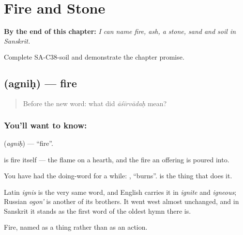 
\chapter{Fire and Stone}
\label{ch:sa-fire-and-stone}

\begin{chapteropening}
\textbf{By the end of this chapter:} \emph{I can name fire, ash, a stone, sand and soil in Sanskrit.}

Complete SA-C38-soil and demonstrate the chapter promise.
\end{chapteropening}

\section[\texorpdfstring{\sk{अग्निः} (agniḥ)}{अग्निः (agniḥ)}]{ (agniḥ) — fire}

\label{lesson:SA-C38-fire}



\begin{quote}
Before the new word: what did \emph{āśīrvādaḥ} mean?
\end{quote}

\subsection*{You'll want to know: }
\textbf{} (\emph{agniḥ}) — \textquotedblleft{}fire\textquotedblright{}.

\textbf{} is fire itself — the flame on a hearth, and the fire an offering is poured into.

You have had the doing-word for a while: , \textquotedblleft{}burns\textquotedblright{}. \textbf{} is the thing that does it.

Latin \emph{ignis} is the very same word, and English carries it in \emph{ignite} and \emph{igneous}; Russian \emph{ogon'} is another of its brothers. It went west almost unchanged, and in Sanskrit it stands as the first word of the oldest hymn there is.

\begin{grammarlens}[title={What you've built}]
Fire, named as a thing rather than as an action.
\end{grammarlens}

